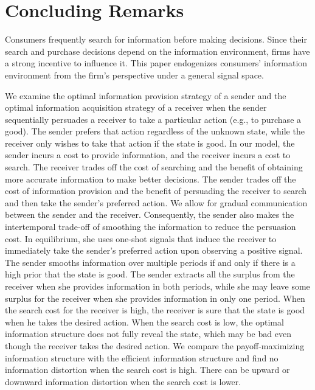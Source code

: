 \documentclass[11pt]{extarticle}
\begin{document}



\section{Concluding Remarks}
Consumers frequently search for information before making decisions. Since their search and purchase decisions depend on the information environment, firms have a strong incentive to influence it. This paper endogenizes consumers' information environment from the firm's perspective under a general signal space.

We examine the optimal information provision strategy of a sender and the optimal information acquisition strategy of a receiver when the sender sequentially persuades a receiver to take a particular action (e.g., to purchase a good). The sender prefers that action regardless of the unknown state, while the receiver only wishes to take that action if the state is good. In our model, the sender incurs a cost to provide information, and the receiver incurs a cost to search. The receiver trades off the cost of searching and the benefit of obtaining more accurate information to make better decisions. The sender trades off the cost of information provision and the benefit of persuading the receiver to search and then take the sender's preferred action. We allow for gradual communication between the sender and the receiver. Consequently, the sender also makes the intertemporal trade-off of smoothing the information to reduce the persuasion cost. In equilibrium, she uses one-shot signals that induce the receiver to immediately take the sender's preferred action upon observing a positive signal. The sender smooths information over multiple periods if and only if there is a high prior that the state is good. The sender extracts all the surplus from the receiver when she provides information in both periods, while she may leave some surplus for the receiver when she provides information in only one period. When the search cost for the receiver is high, the receiver is sure that the state is good when he takes the desired action. When the search cost is low, the optimal information structure does not fully reveal the state, which may be bad even though the receiver takes the desired action. We compare the payoff-maximizing information structure with the efficient information structure and find no information distortion when the search cost is high. There can be upward or downward information distortion when the search cost is lower.
\end{document}
